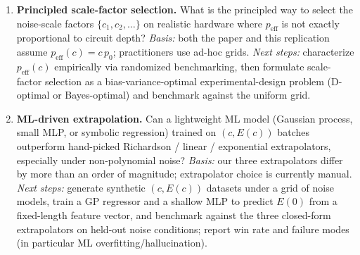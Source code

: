 \begin{enumerate}
\item \textbf{Principled scale-factor selection.} What is the principled
way to select the noise-scale factors $\{c_1, c_2, \dots\}$ on realistic
hardware where $p_{\mathrm{eff}}$ is not exactly proportional to circuit
depth? \emph{Basis:} both the paper and this replication assume
$p_{\mathrm{eff}}(c) = c\,p_0$; practitioners use ad-hoc grids.
\emph{Next steps:} characterize $p_{\mathrm{eff}}(c)$ empirically via
randomized benchmarking, then formulate scale-factor selection as a
bias-variance-optimal experimental-design problem (D-optimal or
Bayes-optimal) and benchmark against the uniform grid.

\item \textbf{ML-driven extrapolation.} Can a lightweight ML model
(Gaussian process, small MLP, or symbolic regression) trained on
$(c, E(c))$ batches outperform hand-picked Richardson / linear /
exponential extrapolators, especially under non-polynomial noise?
\emph{Basis:} our three extrapolators differ by more than an order of
magnitude; extrapolator choice is currently manual.
\emph{Next steps:} generate synthetic $(c, E(c))$ datasets under a grid of
noise models, train a GP regressor and a shallow MLP to predict $E(0)$
from a fixed-length feature vector, and benchmark against the three
closed-form extrapolators on held-out noise conditions; report win rate
and failure modes (in particular ML overfitting/hallucination).

\end{enumerate}
